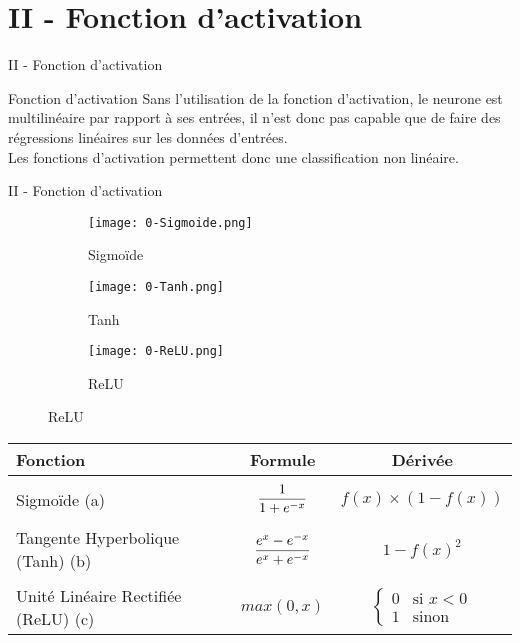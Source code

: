 \section{II - Fonction d'activation}
\begin{frame}{II - Fonction d'activation}
\begin{block}{Fonction d'activation}
Sans l'utilisation de la fonction d'activation, le neurone est multilinéaire par rapport à ses entrées, il n'est donc pas capable que de faire des régressions linéaires sur les données d'entrées. \\
Les fonctions d'activation permettent donc une classification non linéaire.
\end{block}
\end{frame}


\begin{frame}{II - Fonction d'activation}
\begin{figure}
	\begin{subfigure}[]{0.3\textwidth}
		\texttt{[image: 0-Sigmoide.png]}
  		\caption{Sigmoïde}
	\end{subfigure}
	\begin{subfigure}[]{0.3\textwidth}
		\texttt{[image: 0-Tanh.png]}
  		\caption{Tanh}
	\end{subfigure}
	\begin{subfigure}[]{0.3\textwidth}
		\texttt{[image: 0-ReLU.png]}
		\caption{ReLU}
	\end{subfigure}
\end{figure}

\begin{block}{}
\centering
\begin{tabular}{ l || c | c | }
   Fonction & Formule & Dérivée \\ \hline \\
   Sigmoïde (a) & $\mathlarger{\frac{1}{1+e^{-x}}}$ & $f(x) \times (1-f(x))$ \\ \\
   Tangente Hyperbolique (Tanh) (b) & $\mathlarger{\frac{e^{x}-e^{-x}}{e^{x}+e^{-x}}}$ & $1-f(x)^2$ \\ \\
   Unité Linéaire Rectifiée (ReLU) (c) & $max(0, x)$ & $ \left\{\begin{array}{ll}
      														  0 & \mbox{si } x<0 \\
     														  1 & \mbox{sinon }   \end{array}\right.$ \\
\end{tabular}
\end{block}
\end{frame}

